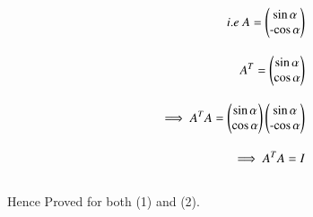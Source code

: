 \begin{enumerate}
\begin{align}
i.e \ A = \myvec{\sin{\alpha} \\ $-$\cos{\alpha}}\\[1em]
A^T = \myvec{\sin{\alpha} \\ \cos{\alpha}} \\[1em]
\implies A^TA = \myvec{\sin{\alpha} \\ \cos{\alpha}}\myvec{\sin{\alpha} \\ $-$\cos{\alpha}} \\[1em]
\implies A^TA = I
\end{align}\\
Hence Proved for both (1) and (2).
\end{enumerate}
